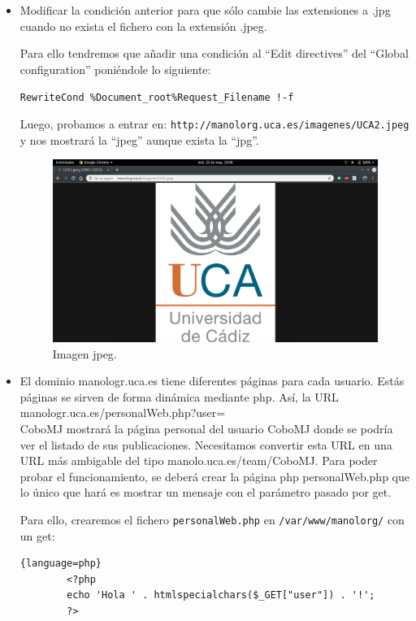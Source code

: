 \documentclass[12pt,letterpaper]{article}
\begin{document}
\begin{itemize}
	\item Modificar la condición anterior para que sólo cambie las extensiones a .jpg cuando no exista el fichero con la extensión .jpeg.

	Para ello tendremos que añadir una condición al ``Edit directives'' del ``Global configuration'' poniéndole lo siguiente:
	\begin{center}
		\texttt{RewriteCond \%{Document\_root}\%{Request\_Filename} !-f}
	\end{center}
	
	Luego, probamos a entrar en: \texttt{http://manolorg.uca.es/imagenes/UCA2.jpeg} y nos mostrará la ``jpeg'' aunque exista la ``jpg''.
	\newpage
	\begin{figure}[h]
		\centering
		\includegraphics[scale=0.34]{Imagen2.png}
		\caption{Imagen jpeg.}
		\label{Imagen jpeg}
	\end{figure}
	
	\item El dominio manologr.uca.es tiene diferentes páginas para cada usuario. Estás páginas se sirven de forma dinámica mediante php. Así, la URL manologr.uca.es/personalWeb.php?user=\\CoboMJ mostrará la página personal del usuario CoboMJ donde se podría ver el listado de sus	publicaciones. Necesitamos convertir esta URL en una URL más ambigable del tipo manolo.uca.es/team/CoboMJ. Para poder probar el funcionamiento, se deberá crear la página php personalWeb.php que lo único que hará es mostrar un mensaje con el parámetro pasado por get.
	
	Para ello, crearemos el fichero \texttt{personalWeb.php} en \texttt{/var/www/manolorg/} con un get:
	\begin{lstlisting}{language=php}
		<?php
		echo 'Hola ' . htmlspecialchars($_GET["user"]) . '!';
		?>
	\end{lstlisting}
	

\end{itemize}
\end{document}
